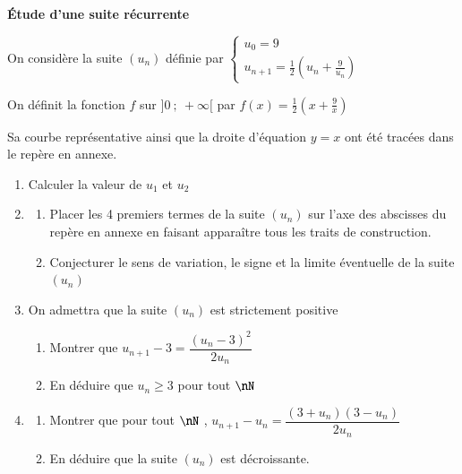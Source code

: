 \documentclass[oneside,12pt]{article}
\begin{document}
\newpage
\textbf{\huge Étude d'une suite récurrente}

On considère la suite $(u_n)$ définie par $\begin{cases} u_0=9 \\ u_{n+1}=\frac{1}{2} \left( u_n + \frac{9}{u_n} \right)\end{cases}$

On définit la fonction $f$ sur $]0~;~+\infty[$ par $f(x)=\frac{1}{2}\left(x+\frac{9}{x}\right)$
	
Sa courbe représentative ainsi que la droite d'équation $y=x$ ont été tracées dans le repère en annexe.

\begin{enumerate}
	\item Calculer la valeur de $u_1$ et $u_2$
	\item \begin{enumerate}
		\item Placer les 4 premiers termes de la suite $(u_n)$ sur l'axe des abscisses du repère en annexe en faisant apparaître tous les traits de construction.
		\item Conjecturer le sens de variation, le signe et la limite éventuelle de la suite $(u_n)$
	\end{enumerate}
	\item On admettra que la suite $(u_n)$ est strictement positive
	\begin{enumerate}
		\item Montrer que $u_{n+1}-3=\dfrac{(u_n-3)^2}{2u_n}$
		\item En déduire que $u_n \geq 3$ \quad pour tout $\nN$
	\end{enumerate}
	\item \begin{enumerate}
		\item Montrer que pour tout $\nN$ , $u_{n+1}-u_n=\dfrac{(3+u_n)(3-u_n)}{2u_n}$
		\item En déduire que la suite $(u_n)$ est décroissante.
	\end{enumerate}
\end{enumerate}

\vspace{1cm}
\begin{center}
\end{center}
\end{document}
